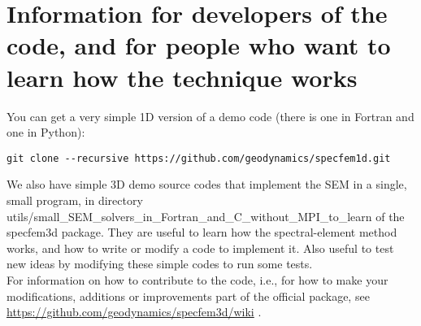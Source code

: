 
\chapter{Information for developers of the code, and for people who want to learn how the technique works}\label{cha:developers}

You can get a very simple 1D version of a demo code (there is one in Fortran and one in Python):
\begin{verbatim}
git clone --recursive https://github.com/geodynamics/specfem1d.git
\end{verbatim}

\noindent We also have simple 3D demo source codes that implement the SEM in a single, small program, in directory\\
utils/small\_SEM\_solvers\_in\_Fortran\_and\_C\_without\_MPI\_to\_learn of the specfem3d package.
They are useful to learn how the spectral-element method works, and how to write or modify a code to implement it.
Also useful to test new ideas by modifying these simple codes to run some tests.\\

\noindent For information on how to contribute to the code, i.e., for how to make your modifications, additions or improvements part of the
official package, see \url{https://github.com/geodynamics/specfem3d/wiki} .


